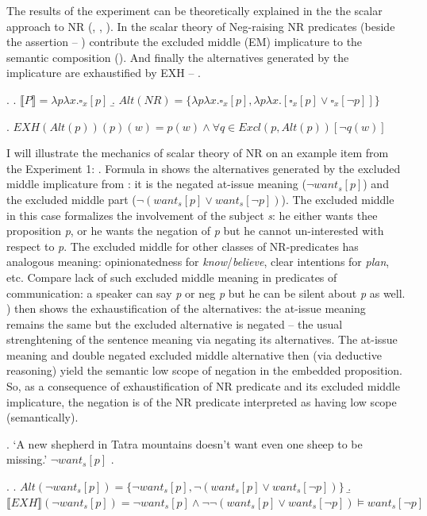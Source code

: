 \documentclass[12pt]{scrartcl}
\begin{document}
The results of the experiment can be theoretically explained in the the scalar approach to NR (\citealt{horn1973semantic}, \citealt{romoli2012soft}, \citealt{romoli2013scalar}). In the scalar theory of Neg-raising  NR predicates (beside the assertion -- \Next[a]) contribute the  excluded middle (EM) implicature to the semantic composition (\Next[b]). And finally the   alternatives generated by the implicature are exhaustified by EXH -- \NNext.

\ex. \a. \(\llbracket P \rrbracket = \lambda p\lambda x.\square_x[p]\)
\b.
\(Alt(NR)=\{\lambda p\lambda x.\square_x[p],\lambda p\lambda x.[\square_x[p] \vee \square_x[\neg p]]\}\)

\ex.
\(EXH(Alt(p))(p)(w) = p(w) \wedge \forall q \in Excl(p,Alt(p))[\neg q(w)]\)

I will illustrate the mechanics of scalar theory of NR on an example item from the Experiment 1: \Next. Formula in \NNext[a] shows the alternatives generated by the excluded middle implicature from \LLast[b]: it is the negated at-issue meaning ($\neg want_s[p]$) and the excluded middle part ($\neg(want_s[p] \vee want_s[\neg p])$). The excluded middle in this case formalizes the involvement of the subject \textit{s}: he either wants thee proposition \textit{p}, or he wants the negation of \textit{p} but he cannot un-interested with respect to \textit{p}. The excluded middle for other classes of NR-predicates has analogous meaning: opinionatedness for \textit{know}/\textit{believe}, clear intentions for \textit{plan}, etc. Compare lack of such excluded middle meaning in predicates of communication: a speaker can say \textit{p} or neg \textit{p} but he can be silent about \textit{p} as well. \Next[b]) then shows the exhaustification of the alternatives: the at-issue meaning remains the same but the excluded alternative is negated -- the usual strenghtening of the sentence meaning via negating its alternatives. The at-issue meaning and double negated excluded middle alternative then (via deductive reasoning) yield the semantic low scope of negation in the embedded proposition. So, as a consequence of exhaustification of NR predicate and its excluded middle implicature, the negation is of the NR predicate interpreted as having low scope (semantically).
  

\ex. `A new shepherd in Tatra mountains doesn't want even one sheep to
be missing.' \(\neg want_s[p]\) .

\ex. \a.
\(Alt(\neg want_s[p])=\{\neg want_s[p], \neg(want_s[p] \vee want_s[\neg p])\}\)
\b.
\(\llbracket EXH\rrbracket (\neg want_s[p])=\neg want_s[p] \wedge \neg \neg(want_s[p] \vee want_s[\neg p]) \models want_s[\neg p]\)
\end{document}
